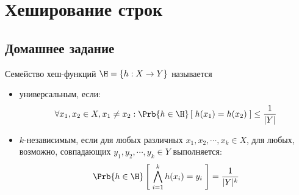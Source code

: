 \section{Хеширование строк}

\subsection{Домашнее задание}

  \begin{definition} Семейство хеш-функций $\H = \{ h : X \rightarrow Y \}$ называется
    \begin{itemize}
      \item универсальным, если:
        $$\forall x_1, x_2 \in X, x_1 \neq x_2: \Prb{h \in \H}\left[ \; h(x_1) = h(x_2) \; \right] \le \frac{1}{|Y|}$$

      \item $k$-независимым, если 
        для любых различных $x_1, x_2, \cdots, x_k \in X$, для любых, возможно, совпадающих $y_1, y_2, \cdots, y_k \in Y$ выполняется:
        $$\Prb{h \in \H}\left[ \; \bigwedge_{i=1}^k h(x_i) = y_i \; \right] = \frac{1}{|Y|^k}$$
    \end{itemize}
  \end{definition}

